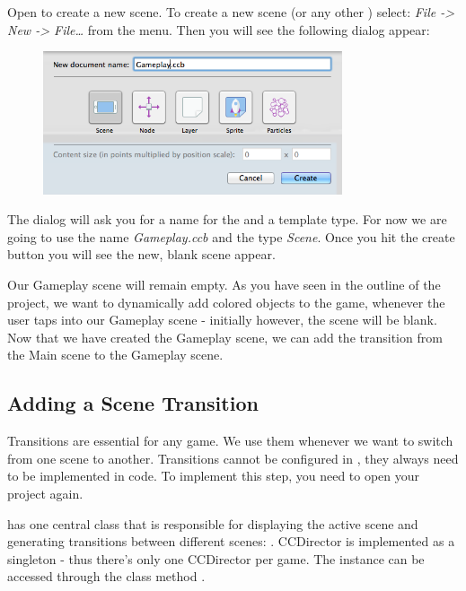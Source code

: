 \begin{leftbar}
Open \SB{} to create a new scene. To create a new scene (or any
other \ccbfile{}) select: \textit{File -> New -> File\ldots} from the \SB{} menu.
Then you will see the following dialog appear:

\begin{figure}[H]
		\centering
		\includegraphics[width=250pt]{images/firstproject/new_scene.png}
\end{figure}

The dialog will ask you for a name for the \ccbfile{} and a template type. For
now we are going to use the name \textit{Gameplay.ccb} and the type
\textit{Scene}. Once you hit the create button you will see the new, blank
scene appear.
\end{leftbar}

Our Gameplay scene will remain empty. As you have seen in the outline
of the project, we want to dynamically add colored objects to the game, whenever
the user taps into our Gameplay scene - initially however, the scene will be
blank. Now that we have created the Gameplay scene, we can add the transition
from the Main scene to the Gameplay scene.

\subsection{Adding a Scene Transition}
Transitions  are essential for any game. We use them
whenever we want to switch from one scene to another. Transitions cannot be configured in
\SB{}, they always need to be implemented in code. To implement this step,
you need to open your \xcode{} project again.

\cocos{} has one central class that is responsible for displaying the active
scene and generating transitions between different scenes:
. CCDirector is implemented as a
singleton - thus there's only one CCDirector per \cocos{} game. The instance can be accessed
through the class method .

